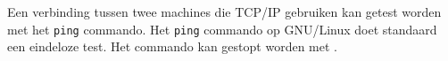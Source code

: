 Een verbinding tussen twee machines die TCP/IP gebruiken kan getest worden met het \texttt{ping} commando. Het \texttt{ping} commando op GNU/Linux doet standaard een eindeloze test. Het commando kan gestopt worden met .

